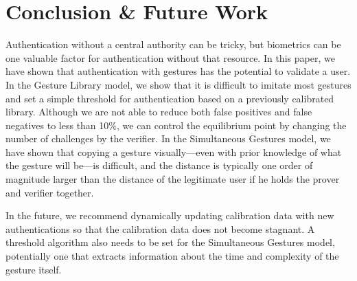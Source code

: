 
\section{Conclusion \& Future Work}
\label{sec:Conclusion}

Authentication without a central authority can be tricky, but biometrics can be one valuable factor for authentication without that resource. In this paper, we have shown that authentication with gestures has the potential to validate a user. In the Gesture Library model, we show that it is difficult to imitate most gestures and set a simple threshold for authentication based on a previously calibrated library. Although we are not able to reduce both false positives and false negatives to less than 10\%, we can control the equilibrium point by changing the number of challenges by the verifier. In the Simultaneous Gestures model, we have shown that copying a gesture visually---even with prior knowledge of what the gesture will be---is difficult, and the distance is typically one order of magnitude larger than the distance of the legitimate user if he holds the prover and verifier together. 

In the future, we recommend dynamically updating calibration data with new authentications so that the calibration data does not become stagnant. A threshold algorithm also needs to be set for the Simultaneous Gestures model, potentially one that extracts information about the time and complexity of the gesture itself.

